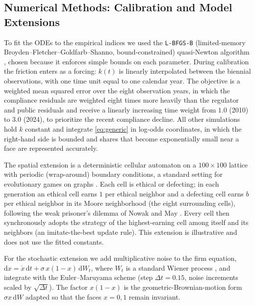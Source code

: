 \documentclass[10pt]{article}
\begin{document}
\subsection{Numerical Methods: Calibration and Model Extensions}\label{sec:ml}
To fit the ODEs to the empirical indices we used the \texttt{L-BFGS-B} (limited-memory Broyden--Fletcher--Goldfarb--Shanno, bound-constrained) quasi-Newton algorithm \cite{byrd1995}, chosen because it enforces simple bounds on each parameter. During calibration the friction enters as a forcing: $k(t)$ is linearly interpolated between the biennial observations, with one time unit equal to one calendar year. The objective is a weighted mean squared error over the eight observation years, in which the compliance residuals are weighted eight times more heavily than the regulator and public residuals and receive a linearly increasing time weight from $1.0$ (2010) to $3.0$ (2024), to prioritize the recent compliance decline. All other simulations hold $k$ constant and integrate \cref{eq:generic} in log-odds coordinates, in which the right-hand side is bounded and shares that become exponentially small near a face are represented accurately.

The spatial extension is a deterministic cellular automaton on a $100\times100$ lattice with periodic (wrap-around) boundary conditions, a standard setting for evolutionary games on graphs \cite{szabo2007}. Each cell is ethical or defecting; in each generation an ethical cell earns $1$ per ethical neighbor and a defecting cell earns $b$ per ethical neighbor in its Moore neighborhood (the eight surrounding cells), following the weak prisoner's dilemma of Nowak and May \cite{nowak1992}. Every cell then synchronously adopts the strategy of the highest-earning cell among itself and its neighbors (an imitate-the-best update rule). This extension is illustrative and does not use the fitted constants.

For the stochastic extension we add multiplicative noise to the firm equation, $\mathrm{d} x = \dot x\,\mathrm{d} t + \sigma\,x(1-x)\,\mathrm{d} W_t$, where $W_t$ is a standard Wiener process \cite{oksendal2003}, and integrate with the Euler--Maruyama scheme (step $\Delta t=0.15$, noise increments scaled by $\sqrt{\Delta t}$). The factor $x(1-x)$ is the geometric-Brownian-motion form $\sigma x\,\mathrm{d} W$ adapted so that the faces $x=0,1$ remain invariant.
\end{document}
